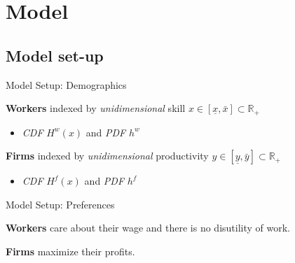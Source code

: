 \documentclass[notes,11pt, aspectratio=169]{beamer}
\newenvironment{wideitemize}{\itemize\addtolength{\itemsep}{10pt}}{\enditemize}
\begin{document}
\section{Model}

\subsection{Model set-up}
\begin{frame}{Model Setup: Demographics}

	\begin{wideitemize}
		\item  \textbf{Workers} indexed by \textit{unidimensional} skill $x\in[\underline{x},  \bar{x} ]\subset \mathbb{R}_+$
		\begin{itemize}
			\item  \textit{CDF} $H^w(x)$ and \textit{PDF} $h^w$  
		\end{itemize}
		\item  \textbf{Firms} indexed by \textit{unidimensional} productivity $y\in[\underline{y},  \bar{y} ]\subset \mathbb{R}_+$
    \begin{itemize}
        \item \textit{CDF} $H^f(x)$ and \textit{PDF} $h^f$  
    \end{itemize}
\end{wideitemize}
\end{frame}

\begin{frame}{Model Setup: Preferences}

	
	\begin{wideitemize}
		\item \textbf{Workers} care about their wage and there is no disutility of work.
		\item  \textbf{Firms} maximize their profits.
	\end{wideitemize}

\end{frame}
\end{document}
